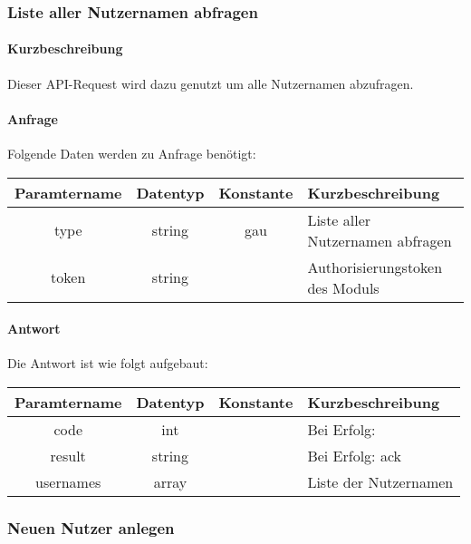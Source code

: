 \subsubsection{Liste aller Nutzernamen abfragen}
\paragraph{Kurzbeschreibung}Dieser API-Request wird dazu genutzt um alle Nutzernamen abzufragen.
\paragraph{Anfrage}Folgende Daten werden zu Anfrage benötigt:
\begin{table}[H]
	\begin{tabular}{|c|c|c|p{6.5cm}|}
		\hline
		\textbf{Paramtername} & \textbf{Datentyp} & \textbf{Konstante} & \textbf{Kurzbeschreibung}                                                                                               \\ \hline
		type                & string            & gau                & Liste aller Nutzernamen abfragen \\ \hline
		token               & string            &                    & Authorisierungstoken des Moduls \\ \hline
	\end{tabular}
\end{table}
\paragraph{Antwort}Die Antwort ist wie folgt aufgebaut:
\begin{table}[H]
	\begin{tabular}{|c|c|c|p{6.5cm}|}
		\hline
		\textbf{Paramtername} & \textbf{Datentyp} & \textbf{Konstante} & \textbf{Kurzbeschreibung}            \\ \hline                
		code                & int              &                 & Bei Erfolg: {\glqq 0\grqq} \\ \hline
		result              & string           &                 & Bei Erfolg: {\glqq ack\grqq} \\ \hline
		usernames           & array            &                 & Liste der Nutzernamen \\ \hline
	\end{tabular}
\end{table}
\subsubsection{Neuen Nutzer anlegen}
